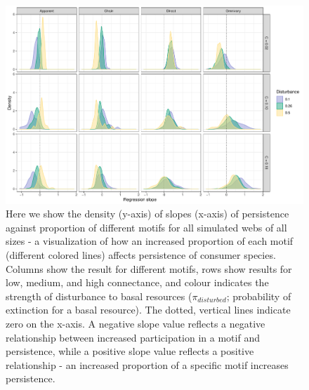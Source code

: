 \documentclass[12pt]{article}
\begin{document}
\begin{spacing}{2.0}
    \begin{figure}[hb!]
    \centering
        \includegraphics[width=\textwidth]{figures/Fig4.pdf}
        \caption{Here we show the density (y-axis) of slopes (x-axis) of persistence against proportion of different motifs for all simulated webs of all sizes - a visualization of how an increased proportion of each motif (different colored lines) affects persistence of consumer species. Columns show the result for different motifs, rows show results for low, medium, and high connectance, and colour indicates the strength of disturbance to basal resources ($\pi_{disturbed}$; probability of extinction for a basal resource). The dotted, vertical lines indicate zero on the x-axis. A negative slope value reflects a negative relationship between increased participation in a motif and persistence, while a positive slope value reflects a positive relationship - an increased proportion of a specific motif increases persistence.}
        \label{fig:density_prop}
    \end{figure}    



\end{spacing}
\end{document}
